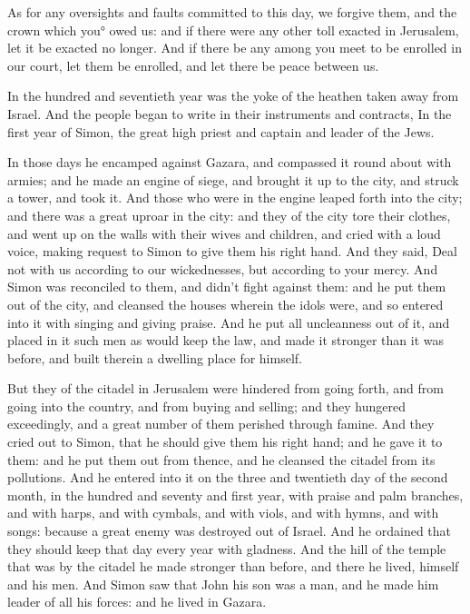 {As for any oversights and faults committed to this day, we forgive them, and the crown which you° owed us: and if there were any other toll exacted in Jerusalem, let it be exacted no longer.
And if there be any among you meet to be enrolled in our court, let them be enrolled, and let there be peace between us.
\par }{\PP {}In
 the hundred and seventieth year was the yoke of the heathen taken away from Israel.
And the people began to write in their instruments and contracts, In the first year of Simon, the great high priest and captain and leader of the Jews.
\par }{\PP {}In those days he encamped against
 Gazara, and compassed it round about with armies; and he made an engine of siege, and brought it up to the city, and struck a tower, and took it.
And those who were in the engine leaped forth into the city; and there was a great uproar in the city:
and they of the city tore their clothes, and went up on the walls with their wives and children, and cried with a loud voice, making request to Simon to give them
 his right hand.
And they said, Deal not with us according to our wickednesses, but according to your mercy.
And Simon was reconciled to them, and didn’t fight against them: and he put them out of the city, and cleansed the houses wherein the idols were, and so entered into it with singing and giving praise.
And he put all uncleanness out of it, and placed in it such men as would keep the law, and made it stronger than it was before, and built therein a dwelling place for himself.
\par }{\PP {}But they of the citadel in Jerusalem were hindered from going forth, and from going into the country, and from buying and selling; and they hungered exceedingly, and a great number of them perished through famine.
And they cried out to Simon, that he should give them his right hand; and he gave it to them: and he put them out from thence, and he cleansed the citadel from its pollutions.
And he entered into it on the three and twentieth day of the second month, in
 the hundred and seventy and first year, with praise and palm branches, and with harps, and with cymbals, and with viols, and with hymns, and with songs: because a great enemy was destroyed out of Israel.
And he ordained that they should keep that day every year with gladness. And the hill of the temple that was by the citadel he made stronger than before, and there he lived, himself and his men.
And Simon saw that John his son was a
{} man, and he made him leader of all his forces: and he lived in Gazara.

}

